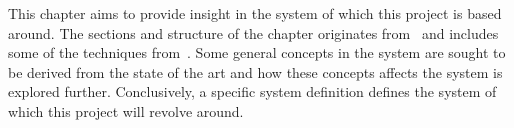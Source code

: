 This chapter aims to provide insight in the system of which this project is based around. The sections and structure of the chapter originates from~ and includes some of the techniques from~. Some general concepts in the system are sought to be derived from the state of the art and how these concepts affects the system is explored further. Conclusively, a specific system definition defines the system of which this project will revolve around.
